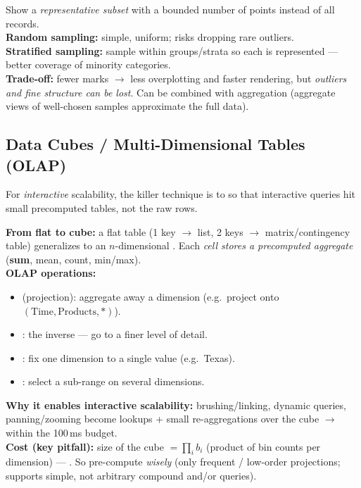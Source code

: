 \begin{algobox}
Show a \emph{representative subset} with a bounded number of points instead of
all records.\\
\textbf{Random sampling:} simple, uniform; risks dropping rare outliers.\\
\textbf{Stratified sampling:} sample within groups/strata so each is
represented --- better coverage of minority categories.\\
\textbf{Trade-off:} fewer marks $\to$ less overplotting and faster rendering,
but \emph{outliers and fine structure can be lost}. Can be combined with
aggregation (aggregate views of well-chosen samples approximate the full data).
\end{algobox}

\subsection{Data Cubes / Multi-Dimensional Tables (OLAP)}

For \emph{interactive} scalability, the killer technique is to
 so that interactive queries hit small
precomputed tables, not the raw rows.

\begin{algobox}
\textbf{From flat to cube:} a flat table (1 key $\to$ list, 2 keys $\to$
matrix/contingency table) generalizes to an $n$-dimensional .
Each \emph{cell stores a precomputed aggregate} (\textbf{sum}, mean, count,
min/max).\\
\textbf{OLAP operations:}
\begin{itemize}
  \item {} (projection): aggregate away a dimension
        (e.g.\ project onto $(\text{Time},\text{Products},*)$).
  \item {}: the inverse --- go to a finer level of detail.
  \item {}: fix one dimension to a single value (e.g.\ Texas).
  \item {}: select a sub-range on several dimensions.
\end{itemize}
\textbf{Why it enables interactive scalability:} brushing/linking, dynamic
queries, panning/zooming become lookups + small re-aggregations over the cube
$\to$ within the 100\,ms budget.\\
\textbf{Cost (key pitfall):} size of the cube $=\prod_i b_i$ (product of bin
counts per dimension) --- . So
pre-compute \emph{wisely} (only frequent / low-order projections; supports
simple, not arbitrary compound and/or queries).
\end{algobox}

